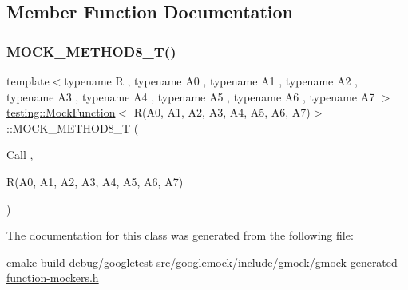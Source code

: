 \subsection{Member Function Documentation}
\mbox{\label{classtesting_1_1MockFunction_3_01R_07A0_00_01A1_00_01A2_00_01A3_00_01A4_00_01A5_00_01A6_00_01A7_08_4_a895c470e00e07294ab42c09588ae1e4c}} 
\subsubsection{\texorpdfstring{MOCK\_METHOD8\_T()}{MOCK\_METHOD8\_T()}}
{\footnotesize\ttfamily template$<$typename R , typename A0 , typename A1 , typename A2 , typename A3 , typename A4 , typename A5 , typename A6 , typename A7 $>$ \\
\mbox{\hyperlink{classtesting_1_1MockFunction}{testing\+::\+Mock\+Function}}$<$ R(A0, A1, A2, A3, A4, A5, A6, A7)$>$\+::M\+O\+C\+K\+\_\+\+M\+E\+T\+H\+O\+D8\+\_\+T (\begin{DoxyParamCaption}\item[{Call}]{,  }\item[{R(A0, A1, A2, A3, A4, A5, A6, A7)}]{ }\end{DoxyParamCaption})}



The documentation for this class was generated from the following file\+:\begin{DoxyCompactItemize}
\item 
cmake-\/build-\/debug/googletest-\/src/googlemock/include/gmock/\mbox{\hyperlink{gmock-generated-function-mockers_8h}{gmock-\/generated-\/function-\/mockers.\+h}}\end{DoxyCompactItemize}
